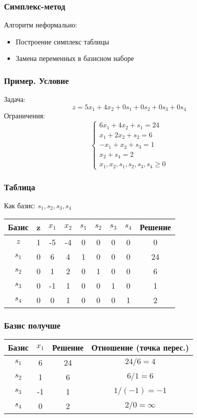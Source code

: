 \documentclass[12pt]{beamer}
\begin{document}
	\begin{frame}
		\frametitle{Симплекс-метод}
		Алгоритм неформально: 
		\begin{itemize}
			\item Построение симплекс таблицы
			\item Замена переменных в базисном наборе
		\end{itemize}
	\end{frame}
	\begin{frame}
		\frametitle{Пример. Условие}
		Задача:
		\[z=5x_1+4x_2+0s_1+0s_2+0s_3+0s_4\]
		Ограничения: 
		\begin{equation}
			\begin{cases}	
				6x_1+4x_2+s_1= 24\\
				x_1+2x_2+s_2= 6\\
				-x_1+x_2+s_3=1\\
				x_2+s_4=2\\
				x_1,x_2,s_1,s_2,s_3,s_4\geq0
			\end{cases}
		\end{equation}
	\end{frame}
	\begin{frame}
		\frametitle{Таблица}
		Как базис: $s_1,s_2,s_3,s_4$
		
		\begin{tabular}{|c|c|c|c|c|c|c|c|c|}
			\hline
			Базис & z  & $x_1$ & $x_2$  & $s_1$  & $s_2$  & $s_3$  & $s_4$  & Решение \\
			\hline
			$z $& 1  &  -5 & -4 & 0 & 0  & 0  & 0 & 0 \\
			\hline
			$s_1$& 0 & 6 & 4  & 1  & 0 & 0 & 0 & 24 \\
			
			$s_2$& 0 & 1 & 2 & 0 & 1 & 0 & 0 & 6 \\
			
			$s_3$& 0 & -1 & 1 & 0 & 0 & 1 & 0 & 1 \\
			
			$s_4$& 0 & 0 & 1 & 0 & 0 & 0 & 1 & 2 \\ 
			\hline
		\end{tabular}
	\end{frame}
	\begin{frame}
		\frametitle{Базис получше}
		\begin{tabular}{|c|c|c|c|}
			\hline
			Базис & $x_1$  & Решение & Отношение (точка перес.)  \\
			\hline
			
			$s_1$& 6 & 24 & $24/6=4$  \\
			
			$s_2$& 1 & 6 & $6/1=6$ \\
			
			$s_3$& -1 & 1 & $1/(-1)=-1$ \\
			
			$s_4$& 0 & 2 & $2/0=\infty$ \\ 
			\hline
		\end{tabular}
	\end{frame}
\end{document}
